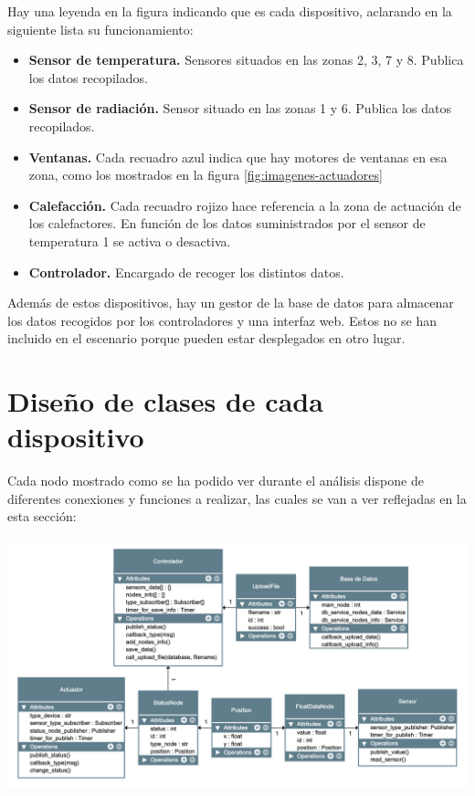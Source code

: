 Hay una leyenda en la figura indicando que es cada dispositivo, aclarando en la siguiente lista su funcionamiento:

\begin{itemize}
    \item \textbf{Sensor de temperatura.} Sensores situados en las zonas 2, 3, 7 y 8. Publica los datos recopilados.
    \item \textbf{Sensor de radiación.} Sensor situado en las zonas 1 y 6. Publica los datos recopilados.
    \item \textbf{Ventanas.} Cada recuadro azul indica que hay motores de ventanas en esa zona, como los mostrados en la figura \ref{fig:imagenes-actuadores}
    \item \textbf{Calefacción.} Cada recuadro rojizo hace referencia a la zona de actuación de los calefactores. En función de los datos suministrados por el sensor de temperatura 1 se activa o desactiva.
    \item \textbf{Controlador.} Encargado de recoger los distintos datos.
\end{itemize}

Además de estos dispositivos, hay un gestor de la base de datos para almacenar los datos recogidos por los controladores y una interfaz web. Estos no se han incluido en el escenario porque pueden estar desplegados en otro lugar.


\section{Diseño de clases de cada dispositivo}

Cada nodo mostrado como se ha podido ver durante el análisis dispone de diferentes conexiones y funciones a realizar, las cuales se van a ver reflejadas en la esta sección:

\begin{center}
    \centering
    \includegraphics[width=\textwidth]{img/05-DiagramaClasesCompleto.png}
    \label{fig:diagrama-clases}
\end{center}

